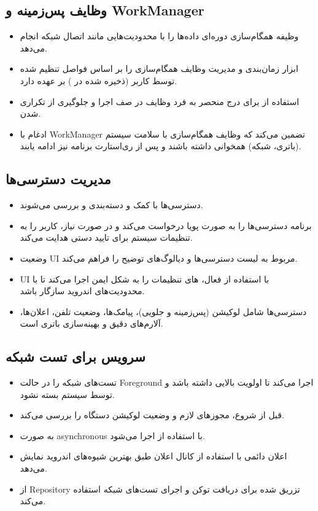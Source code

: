 \subsection{وظایف پس‌زمینه و WorkManager}
\begin{itemize}
    \item {} وظیفه همگام‌سازی دوره‌ای داده‌ها را با محدودیت‌هایی مانند اتصال شبکه انجام می‌دهد.
    \item ابزار  زمان‌بندی و مدیریت وظایف همگام‌سازی را بر اساس فواصل تنظیم شده توسط کاربر (ذخیره شده در ) بر عهده دارد.
    \item استفاده از  برای درج منحصر به فرد وظایف در صف اجرا و جلوگیری از تکراری شدن.
    \item ادغام با WorkManager تضمین می‌کند که وظایف همگام‌سازی با سلامت سیستم (باتری، شبکه) همخوانی داشته باشند و پس از ری‌استارت برنامه نیز ادامه یابند.
\end{itemize}

\subsection{مدیریت دسترسی‌ها}
\begin{itemize}
    \item دسترسی‌ها با کمک  و  دسته‌بندی و بررسی می‌شوند.
    \item برنامه دسترسی‌ها را به صورت پویا درخواست می‌کند و در صورت نیاز، کاربر را به تنظیمات سیستم برای تایید دستی هدایت می‌کند.
    \item {} وضعیت UI مربوط به لیست دسترسی‌ها و دیالوگ‌های توضیح را فراهم می‌کند.
    \item UI با استفاده از  فعال، های تنظیمات را به شکل ایمن اجرا می‌کند تا با محدودیت‌های اندروید سازگار باشد.
    \item دسترسی‌ها شامل لوکیشن (پس‌زمینه و جلویی)، پیامک‌ها، وضعیت تلفن، اعلان‌ها، آلارم‌های دقیق و بهینه‌سازی باتری است.
\end{itemize}

\subsection{سرویس  برای تست شبکه}
\begin{itemize}
    \item {} تست‌های شبکه را در حالت Foreground اجرا می‌کند تا اولویت بالایی داشته باشد و توسط سیستم بسته نشود.
    \item قبل از شروع، مجوزهای لازم و وضعیت لوکیشن دستگاه را بررسی می‌کند.
    \item به صورت asynchronous با استفاده از  اجرا می‌شود.
    \item اعلان دائمی با استفاده از کانال اعلان  طبق بهترین شیوه‌های اندروید نمایش می‌دهد.
    \item از Repository تزریق شده برای دریافت توکن و اجرای تست‌های شبکه استفاده می‌کند.
\end{itemize}

